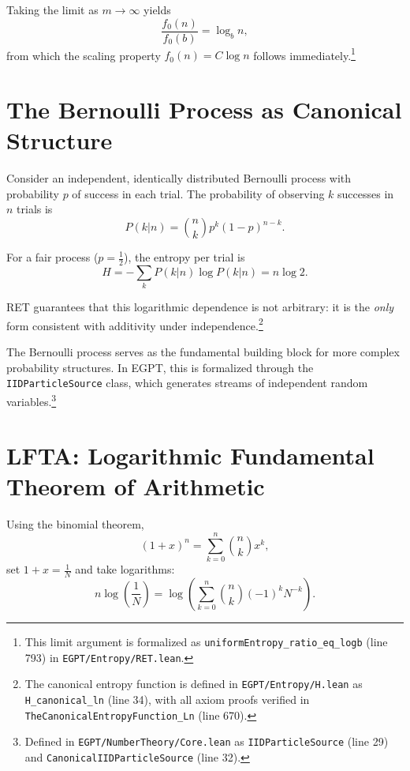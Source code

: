 \documentclass[12pt]{article}
\begin{document}
Taking the limit as $m \to \infty$ yields
\begin{equation}
\frac{f_0(n)}{f_0(b)} = \log_b n,
\end{equation}
from which the scaling property $f_0(n) = C \log n$ follows immediately.\footnote{This limit argument is formalized as \texttt{uniformEntropy\_ratio\_eq\_logb} (line 793) in \texttt{EGPT/Entropy/RET.lean}.}

\section{The Bernoulli Process as Canonical Structure}

Consider an independent, identically distributed Bernoulli process with probability $p$ of success in each trial. The probability of observing $k$ successes in $n$ trials is
\begin{equation}
P(k|n) = \binom{n}{k}p^k(1-p)^{n-k}.
\end{equation}

For a fair process ($p = \frac{1}{2}$), the entropy per trial is
\begin{equation}
H = -\sum_{k} P(k|n)\log P(k|n) = n \log 2.
\end{equation}

RET guarantees that this logarithmic dependence is not arbitrary: it is the \emph{only} form consistent with additivity under independence.\footnote{The canonical entropy function is defined in \texttt{EGPT/Entropy/H.lean} as \texttt{H\_canonical\_ln} (line 34), with all axiom proofs verified in \texttt{TheCanonicalEntropyFunction\_Ln} (line 670).}

The Bernoulli process serves as the fundamental building block for more complex probability structures. In EGPT, this is formalized through the \texttt{IIDParticleSource} class, which generates streams of independent random variables.\footnote{Defined in \texttt{EGPT/NumberTheory/Core.lean} as \texttt{IIDParticleSource} (line 29) and \texttt{CanonicalIIDParticleSource} (line 32).}

\section{LFTA: Logarithmic Fundamental Theorem of Arithmetic}

Using the binomial theorem,
\begin{equation}
(1+x)^n = \sum_{k=0}^n \binom{n}{k}x^k,
\end{equation}
set $1+x = \frac{1}{N}$ and take logarithms:
\begin{equation}
n \log\left(\frac{1}{N}\right) = \log\left(\sum_{k=0}^{n}\binom{n}{k}(-1)^k N^{-k}\right).
\end{equation}
\end{document}
